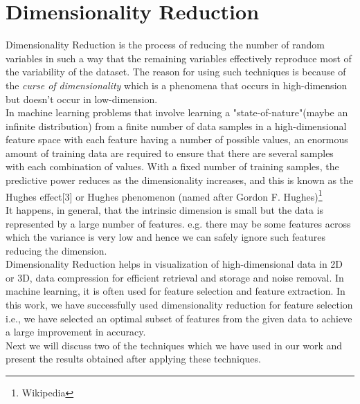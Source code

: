 \chapter{Dimensionality Reduction}
\label{sec:dimensionality_reduction}
Dimensionality Reduction is the process of reducing the number of random variables in such a way that the remaining variables effectively reproduce most of the variability of the dataset.
The reason for using such techniques is because of the \emph{curse of dimensionality} which is a phenomena that occurs in high-dimension but doesn't occur in low-dimension.\\
In machine learning problems that involve learning a "state-of-nature"(maybe an infinite distribution) from a finite number of data samples in a high-dimensional feature space with each feature having a number of possible values, an enormous amount of training data are required to ensure that there are several samples with each combination of values. With a fixed number of training samples, the predictive power reduces as the dimensionality increases, and this is known as the Hughes effect[3] or Hughes phenomenon (named after Gordon F. Hughes)\footnote{Wikipedia}\\
It happens, in general, that the intrinsic dimension is small but the data is represented by a large number of features. e.g. there may be some features across which the variance is very low and hence we can safely ignore such features reducing the dimension.\\
Dimensionality Reduction helps in visualization of high-dimensional data in 2D or 3D, data compression for efficient retrieval and storage and noise removal.
In machine learning, it is often used for feature selection and feature extraction. In this work, we have successfully used dimensionality reduction for feature selection i.e., we have selected an optimal subset of features from the given data to achieve a large improvement in accuracy.\\
Next we will discuss two of the techniques which we have used in our work and present the results obtained after applying these techniques.

